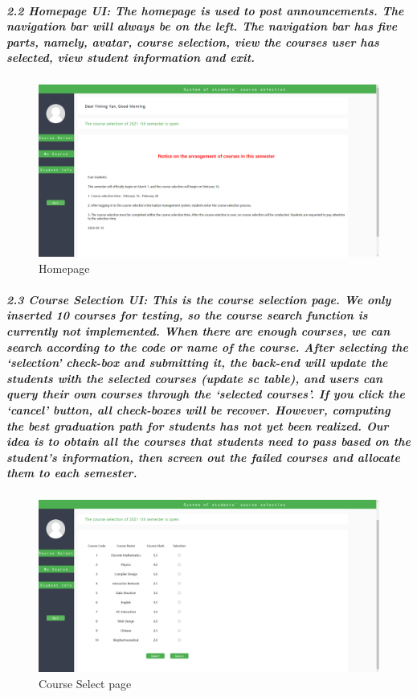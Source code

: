 \documentclass[12pt]{article}
\begin{document}
\newpage

\subparagraph{2.2 Homepage UI: The homepage is used to post announcements. The navigation bar will always be on the left. The navigation bar has five parts, namely, avatar, course selection, view the courses user has selected, view student information and exit.}

\begin{figure}[h]
\centering
\includegraphics[width=14cm]{./UI_homepage.png}
Homepage
\end{figure}
\newpage

\subparagraph{2.3 Course Selection UI: This is the course selection page. We only inserted 10 courses for testing, so the course search function is currently not implemented. When there are enough courses, we can search according to the code or name of the course. After selecting the ‘selection’ check-box and submitting it, the back-end will update the students with the selected courses (update sc table), and users can query their own courses through the ‘selected courses’. If you click the ‘cancel’ button, all check-boxes will be recover. However, computing the best graduation path for students has not yet been realized. Our idea is to obtain all the courses that students need to pass based on the student's information, then screen out the failed courses and allocate them to each semester.}

\begin{figure}[h]
\centering
\includegraphics[width=14cm]{./UI_cs.png}
Course Select page
\end{figure}
\newpage
\end{document}
